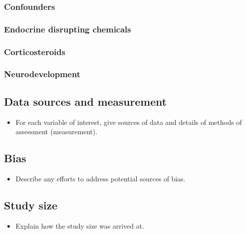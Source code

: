 \documentclass[
  letterpaper,
  DIV=11,
  numbers=noendperiod]{scrartcl}
\providecommand{\tightlist}{%
  \setlength{\itemsep}{0pt}\setlength{\parskip}{0pt}}\usepackage{longtable,booktabs,array}
\begin{document}
\subsubsection{Confounders}\label{sec-confounders}

\subsubsection{Endocrine disrupting chemicals}\label{sec-edcs}

\subsubsection{Corticosteroids}\label{sec-steroids}

\subsubsection{Neurodevelopment}\label{sec-neurodevelopment}

\subsection{Data sources and measurement}\label{sec-dat-sources}

\begin{itemize}
\tightlist
\item
  For each variable of interest, give sources of data and details of
  methods of assessment (measurement).
\end{itemize}

\subsection{Bias}\label{sec-bias}

\begin{itemize}
\tightlist
\item
  Describe any efforts to address potential sources of bias.
\end{itemize}

\subsection{Study size}\label{sec-size}

\begin{itemize}
\tightlist
\item
  Explain how the study size was arrived at.
\end{itemize}
\end{document}
